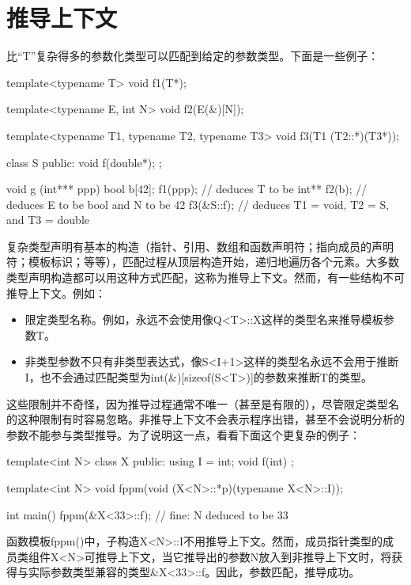 \section{推导上下文}
比“T”复杂得多的参数化类型可以匹配到给定的参数类型。下面是一些例子：

\begin{cpp}
template<typename T>
void f1(T*);

template<typename E, int N>
void f2(E(&)[N]);

template<typename T1, typename T2, typename T3>
void f3(T1 (T2::*)(T3*));

class S {
	public:
	void f(double*);
};

void g (int*** ppp)
{
	bool b[42];
	f1(ppp); // deduces T to be int**
	f2(b); // deduces E to be bool and N to be 42
	f3(&S::f); // deduces T1 = void, T2 = S, and T3 = double
}
\end{cpp} 

复杂类型声明有基本的构造（指针、引用、数组和函数声明符；指向成员的声明符；模板标识；等等），匹配过程从顶层构造开始，递归地遍历各个元素。大多数类型声明构造都可以用这种方式匹配，这称为推导上下文。然而，有一些结构不可推导上下文。例如：

\begin{itemize}
\item 
限定类型名称。例如，永远不会使用像Q<T>::X这样的类型名来推导模板参数T。

\item 
非类型参数不只有非类型表达式，像S<I+1>这样的类型名永远不会用于推断I，也不会通过匹配类型为int(\&)[sizeof(S<T>)]的参数来推断T的类型。
\end{itemize}

这些限制并不奇怪，因为推导过程通常不唯一（甚至是有限的），尽管限定类型名的这种限制有时容易忽略。非推导上下文不会表示程序出错，甚至不会说明分析的参数不能参与类型推导。为了说明这一点，看看下面这个更复杂的例子：

\begin{cpp}
template<int N>
class X {
	public:
	using I = int;
	void f(int) {
	}
};

template<int N>
void fppm(void (X<N>::*p)(typename X<N>::I));

int main()
{
	fppm(&X<33>::f); // fine: N deduced to be 33
}
\end{cpp}

函数模板fppm()中，子构造X<N>::I不用推导上下文。然而，成员指针类型的成员类组件X<N>可推导上下文，当它推导出的参数N放入到非推导上下文时，将获得与实际参数类型兼容的类型\&X<33>::f。因此，参数匹配，推导成功。

